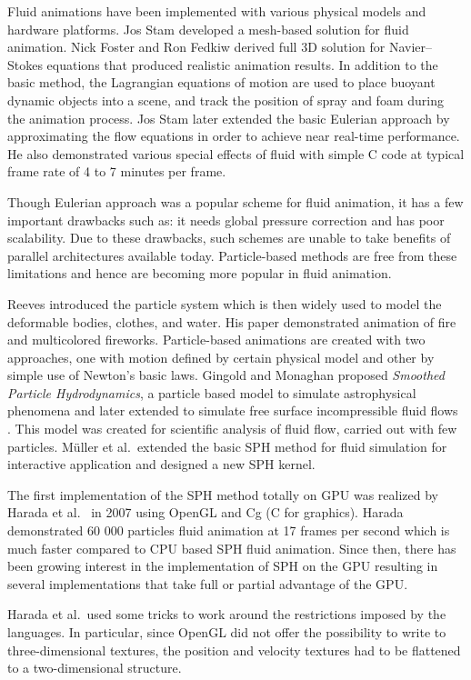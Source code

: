 \documentclass[a4paper, 12pt, oneside]{book}
\begin{document}
\begin{doublespace}
    Fluid animations have been implemented with various physical models and hardware platforms. Jos Stam \cite{stam1999} developed a mesh-based solution for fluid animation. Nick Foster and Ron Fedkiw \cite{foster2001} derived full 3D solution for Navier--Stokes equations that produced realistic animation results. In addition to the basic method, the Lagrangian equations of motion are used to place buoyant dynamic objects into a scene, and track the position of spray and foam during the animation process. Jos Stam \cite{stam2003} later extended the basic Eulerian approach by approximating the flow equations in order to achieve near real-time performance. He also demonstrated various special effects of fluid with simple C code at typical frame rate of 4 to 7 minutes per frame.
    
    Though Eulerian approach was a popular scheme for fluid animation, it has a few important drawbacks such as: it needs global pressure correction and has poor scalability. Due to these drawbacks, such schemes are unable to take benefits of parallel architectures available today. Particle-based methods are free from these limitations and hence are becoming more popular in fluid animation.
    
    Reeves \cite{reeves1983} introduced the particle system which is then widely used to model the deformable bodies, clothes, and water. His paper demonstrated animation of fire and multicolored fireworks. Particle-based animations are created with two approaches, one with motion defined by certain physical model and other by simple use of Newton's basic laws. Gingold and Monaghan proposed \textit{Smoothed Particle Hydrodynamics}, a particle based model to simulate astrophysical phenomena \cite{gingold1977} and later extended to simulate free surface incompressible fluid flows \cite{monaghan1994}. This model was created for scientific analysis of fluid flow, carried out with few particles. Müller et al.\ extended the basic SPH method for fluid simulation for interactive application \cite{muller2003} and designed a new SPH kernel.
    
    The first implementation of the SPH method totally on GPU was realized by Harada et al.\ \cite{harada2007} in 2007 using OpenGL and Cg (C for graphics). Harada demonstrated 60 000 particles fluid animation at 17 frames per second which is much faster compared to CPU based SPH fluid animation. Since then, there has been growing interest in the implementation of SPH on the GPU resulting in several implementations that take full or partial advantage of the GPU.
    
    Harada et al.\ used some tricks to work around the restrictions imposed by the languages. In particular, since OpenGL did not offer the possibility to write to three-dimensional textures, the position and velocity textures had to be flattened to a two-dimensional structure. 
\end{doublespace}
\end{document}
